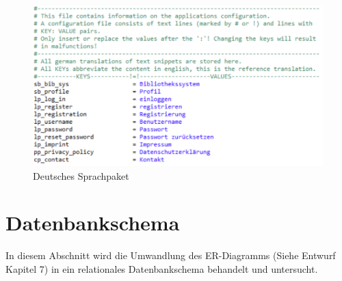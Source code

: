 \documentclass{article}
\begin{document}
\begin{figure}  
\hypertarget{messagesde}{}
\centering
\includegraphics[width=60em]{messagesde}
\caption{Deutsches Sprachpaket}
\end{figure}
\restoregeometry



\section{Datenbankschema}
In diesem Abschnitt wird die Umwandlung des ER-Diagramms (Siehe Entwurf Kapitel 7) in ein relationales Datenbankschema behandelt und untersucht.
\end{document}
